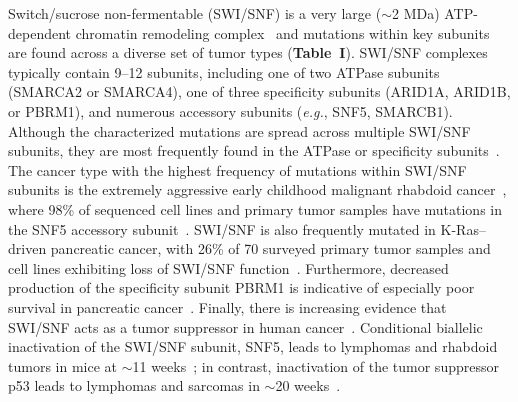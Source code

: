 \documentclass[11pt]{article}
\newcommand\eg{\emph{e.g.}\xspace}
\begin{document}
Switch/sucrose non-fermentable (SWI/SNF) is a very large ($\sim$2 MDa) ATP-dependent chromatin remodeling complex~\citep{Peterson1995} and mutations within key subunits are found across a diverse set of tumor types ({\bf \color{dukeblue}Table~I}). SWI/SNF complexes typically contain 9--12 subunits, including one of two ATPase subunits (SMARCA2 or SMARCA4), one of three specificity subunits (ARID1A, ARID1B, or PBRM1), and numerous accessory subunits (\eg, SNF5, SMARCB1). Although the characterized mutations are spread across multiple SWI/SNF subunits, they are most frequently found in the ATPase or specificity subunits~\citep{Shain2013}. The cancer type with the highest frequency of mutations within SWI/SNF subunits is the extremely aggressive early childhood malignant rhabdoid cancer~\citep{Rorke1996}, where 98\% of sequenced cell lines and primary tumor samples have mutations in the SNF5 accessory subunit~\citep{Versteege1998,Biegel1999}. SWI/SNF is also frequently mutated in K-Ras--driven pancreatic cancer, with 26\% of 70 surveyed primary tumor samples and cell lines exhibiting loss of SWI/SNF function~\citep{Shain2012}. Furthermore, decreased production of the specificity subunit PBRM1 is indicative of especially poor survival in pancreatic cancer~\citep{Numata2013}. Finally, there is increasing evidence that SWI/SNF acts as a tumor suppressor in human cancer~\citep{Shain2013,Reisman2009,Roberts2004,Shain2012}. Conditional biallelic inactivation of the SWI/SNF subunit, SNF5, leads to lymphomas and rhabdoid tumors in mice at $\sim$11 weeks~\citep{Roberts2002}; in contrast, inactivation of the tumor suppressor p53 leads to lymphomas and sarcomas in $\sim$20 weeks~\citep{Williams1994}.
\end{document}
